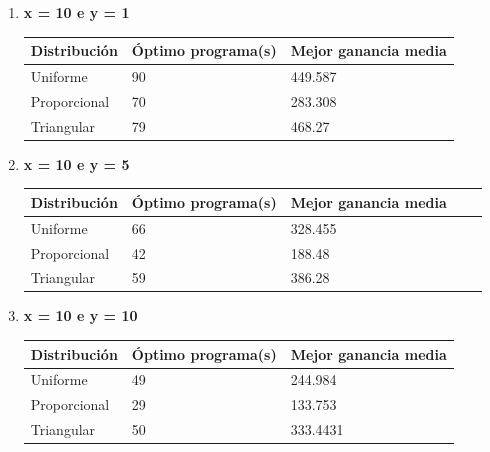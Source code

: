 \documentclass[]{article}
\begin{document}
\begin{enumerate}
	\item \textbf{ x = 10 e y = 1}
	\begin{table}[H]
		\begin{center}

				\begin{tabular}{|l|l|l|}
					
					\hline
					Distribución & Óptimo programa(s) & Mejor ganancia media\\
					\hline \hline
					Uniforme &90 & 449.587
					\\ \hline
					Proporcional & 70 & 283.308
					\\ \hline
					Triangular & 79 & 468.27
					\\ \hline
					
				\end{tabular}
			
			\label{tabla:sencilla}
		\end{center}
	\end{table}
	\item \textbf{ x = 10 e y = 5}
	\begin{table}[H]
		\begin{center}
				\begin{tabular}{|l|l|l|l|l|}
					
					\hline
					 Distribución & Óptimo programa(s) & Mejor ganancia media\\
					\hline \hline
					Uniforme & 66 & 328.455
					\\ \hline
					Proporcional & 42 &  188.48
					\\ \hline
					Triangular & 59 & 386.28
					\\ \hline
					
				\end{tabular}
			
			\label{tabla:sencilla}
		\end{center}
	\end{table}
	\item \textbf{ x = 10 e y = 10}
	\begin{table}[H]
		\begin{center}
				\begin{tabular}{|l|l|l|}
					
					\hline
					Distribución & Óptimo programa(s) & Mejor ganancia media\\
					\hline \hline
					Uniforme & 49 & 244.984
					\\ \hline
					Proporcional & 29& 133.753
					\\ \hline
					Triangular & 50 & 333.4431
					\\ \hline
					
				\end{tabular}
		
			\label{tabla:sencilla}
		\end{center}
	\end{table}
\end{enumerate}
\end{document}
